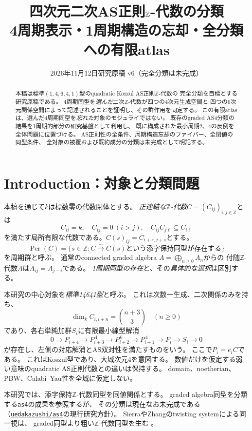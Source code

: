 \documentclass[11pt,a4paper]{ltjsarticle}
\title{四次元二次AS正則\texorpdfstring{$\ZZ$}{Z}-代数の分類\\
\large 4周期表示・1周期構造の忘却・全分類への有限atlas}
\author{}
\date{2026年11月12日\quad 研究原稿 v6（完全分類は未完成）}
\theoremstyle{definition}
\newcommand{\ZZ}{\mathbb Z}
\newcommand{\Per}{\operatorname{Per}}
\begin{document}
\maketitle
\begin{abstract}
本稿は標準$(1,4,6,4,1)$型のquadratic Koszul AS正則$\ZZ$-代数の
完全分類を目標とする研究原稿である。
4周期同型を\emph{選んだ}二次$\ZZ$-代数が四つの4次元生成空間と
四つの6次元関係空間によって記述されることを証明し、その群作用を同定する。
この有限atlasは、選んだ4周期同型を\emph{忘れた}対象のモジュライではない。
既存のgraded AS4分類の結果を1周期的部分の研究基盤として利用し、
既に構成された最小周期2、4の反例を全体問題に位置づける。
AS正則性の全条件、周期構造忘却のファイバー、全閉値の同型条件、
全対象の被覆および既約成分の分類は未完成として明記する。
\end{abstract}
\tableofcontents

\section{Introduction：対象と分類問題}
本稿を通じて$k$は標数零の代数閉体とする。
\emph{正連結な$\ZZ$-代数}$C=(C_{ij})_{i,j\in\ZZ}$とは
\[
 C_{ii}=k,\quad C_{ij}=0\ (i>j),\quad
 C_{ij}C_{j\ell}\subseteq C_{i\ell}
\]
を満たす局所有限な代数である。$C(s)_{ij}=C_{i+s,j+s}$とする。
\[
 \Per(C)=\{s\in\ZZ:C\xrightarrow{\sim}C(s)
 \text{という添字保持同型が存在する}\}
\]
を周期群と呼ぶ。
通常のconnected graded algebra $A=\bigoplus_{n\ge0}A_n$からの
付随$\ZZ$-代数$\check A$は$\check A_{ij}=A_{j-i}$である。
\emph{1周期同型の存在}と、その\emph{具体的な選択}は区別する。

本研究の中心対象を\emph{標準14641型}と呼ぶ。
これは次数一生成、二次関係のみを持ち、
\[
 \dim_k C_{i,i+n}={n+3\choose3}\quad(n\ge0)
\]
であり、各右単純加群$S_i$に有限最小線型解消
\[
 0\longrightarrow P_{i+4}
 \longrightarrow P_{i+3}^{\,4}
 \longrightarrow P_{i+2}^{\,6}
 \longrightarrow P_{i+1}^{\,4}
 \longrightarrow P_i\longrightarrow S_i\longrightarrow0
\]
が存在し、左側の対応解消とAS双対性を満たすものをいう。
ここで$P_i=e_iC$である。
これはKoszul型であり、大域次元4を意図する。
数値だけを仮定する弱い意味のquadratic AS正則代数との違いは保持する。
domain、noetherian、PBW、Calabi--Yau性を全域に仮定しない。

本研究では、添字保持$\ZZ$-代数同型を同値関係とする。
graded algebra同型を分類する\texttt{as4}の成果を参照するが、
その分類は現在なお未完成である
（\href{https://github.com/uedakazushi/as4}{\texttt{uedakazushi/as4}}の現行研究方針）。
SierraやZhangのtwisting systemによる同一視は、
graded同型より粗い$\ZZ$-代数同型を生む
\cite{Zhang,Sierra,MoriNyman}。
\end{document}
